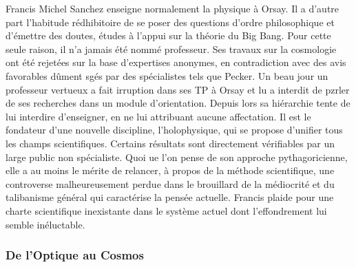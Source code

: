 \documentclass[a4paper,12pt]{article}
\begin{document}
Francis Michel Sanchez enseigne normalement la physique à Orsay. Il a d’autre part l’habitude rédhibitoire de se poser des questions d’ordre philosophique et d’émettre des doutes, études à l’appui sur la théorie du Big Bang. Pour cette seule raison, il n’a jamais été nommé professeur. Ses travaux sur la cosmologie ont été rejetées sur la base d’expertises anonymes, en contradiction avec des avis favorables dûment sgés par des spécialistes tels que Pecker. Un beau jour un professeur vertueux a fait irruption dans ses TP à Orsay et lu a interdit de pzrler de ses recherches dans un module d’orientation. Depuis lors sa hiérarchie tente de lui interdire d’enseigner, en ne lui attribuant aucune affectation. Il est le fondateur d’une nouvelle discipline, l’holophysique, qui se propose d’unifier tous les champs scientifiques. Certains résultats sont directement vérifiables par un large public non spécialiste. Quoi ue l’on pense de son approche pythagoricienne, elle a au moins le mérite de relancer, à propos de la méthode scientifique, une controverse malheureusement perdue dans le brouillard de la médiocrité et du talibanisme général qui caractérise la pensée actuelle. Francis plaide pour une charte scientifique inexistante dans le système actuel dont l’effondrement lui semble inéluctable.

\subsubsection{De l'Optique au Cosmos}
\end{document}
